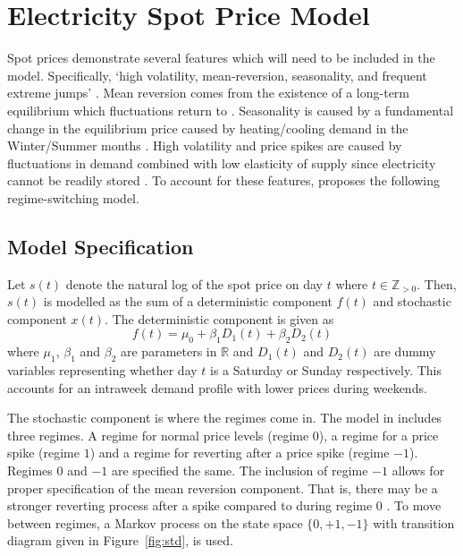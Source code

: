 \section{Electricity Spot Price Model}
\label{sec:model}
Spot prices demonstrate several features which will need to be included in the model. Specifically, `high volatility, mean-reversion, seasonality, and frequent extreme jumps' \citep{huisman_mahieu_2003}. Mean reversion comes from the existence of a long-term equilibrium which fluctuations return to \citep[p.~26]{pilipovic_2007}. Seasonality is caused by a fundamental change in the equilibrium price caused by heating/cooling demand in the Winter/Summer months \citep[p.~30-31]{pilipovic_2007}. High volatility and price spikes are caused by fluctuations in demand combined with low elasticity of supply since electricity cannot be readily stored \citep[p.~26]{pilipovic_2007}. To account for these features, \cite{huisman_mahieu_2003} proposes the following regime-switching model.

\subsection{Model Specification}
\label{subsec:model-spec}

Let $s(t)$ denote the natural log of the spot price on day $t$ where $t \in \mathbb{Z}_{>0}$.
Then, $s(t)$ is modelled as the sum of a deterministic component $f(t)$ and stochastic component $x(t)$. The deterministic component is given as
\begin{equation}
    f(t) = \mu_0 + \beta_1 D_1(t) + \beta_2 D_2(t)
\end{equation}
where $\mu_1$, $\beta_1$ and $\beta_2$ are parameters in $\mathbb{R}$ and $D_1(t)$ and $D_2(t)$ are dummy variables representing whether day $t$ is a Saturday or Sunday respectively. This accounts for an intraweek demand profile with lower prices during weekends.

The stochastic component is where the regimes come in. The model in \cite{huisman_mahieu_2003} includes three regimes. A regime for normal price levels (regime $0$), a regime for a price spike (regime $1$) and a regime for reverting after a price spike (regime $-1$). Regimes $0$ and $-1$ are specified the same. The inclusion of regime $-1$ allows for proper specification of the mean reversion component. That is, there may be a stronger reverting process after a spike compared to during regime 0 \citep{huisman_mahieu_2003}. To move between regimes, a Markov process on the state space $\{0, +1, -1\}$ with transition diagram given in Figure~\ref{fig:std}, is used.


